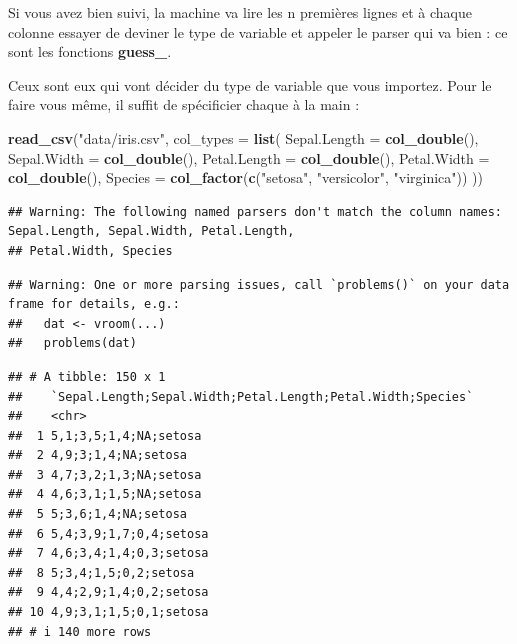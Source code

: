 \documentclass[
]{book}
\newenvironment{Shaded}{\begin{snugshade}}{\end{snugshade}}
\newcommand{\AttributeTok}[1]{\textcolor[rgb]{0.13,0.29,0.53}{#1}}
\newcommand{\FunctionTok}[1]{\textcolor[rgb]{0.13,0.29,0.53}{\textbf{#1}}}
\newcommand{\NormalTok}[1]{#1}
\newcommand{\StringTok}[1]{\textcolor[rgb]{0.31,0.60,0.02}{#1}}
\begin{document}
Si vous avez bien suivi, la machine va lire les n premières lignes et à chaque
colonne essayer de deviner le type de variable et appeler le parser qui va
bien : ce sont les fonctions \textbf{guess\_}.

Ceux sont eux qui vont décider du type de variable que vous importez. Pour le
faire vous même, il suffit de spécificier chaque à la main :

\begin{Shaded}
\begin{Highlighting}[]
\FunctionTok{read\_csv}\NormalTok{(}\StringTok{"data/iris.csv"}\NormalTok{, }\AttributeTok{col\_types =} \FunctionTok{list}\NormalTok{(}
  \AttributeTok{Sepal.Length =} \FunctionTok{col\_double}\NormalTok{(),}
  \AttributeTok{Sepal.Width =} \FunctionTok{col\_double}\NormalTok{(),}
  \AttributeTok{Petal.Length =} \FunctionTok{col\_double}\NormalTok{(),}
  \AttributeTok{Petal.Width =} \FunctionTok{col\_double}\NormalTok{(),}
  \AttributeTok{Species =} \FunctionTok{col\_factor}\NormalTok{(}\FunctionTok{c}\NormalTok{(}\StringTok{"setosa"}\NormalTok{, }\StringTok{"versicolor"}\NormalTok{, }\StringTok{"virginica"}\NormalTok{))}
\NormalTok{))}
\end{Highlighting}
\end{Shaded}

\begin{verbatim}
## Warning: The following named parsers don't match the column names: Sepal.Length, Sepal.Width, Petal.Length,
## Petal.Width, Species
\end{verbatim}

\begin{verbatim}
## Warning: One or more parsing issues, call `problems()` on your data frame for details, e.g.:
##   dat <- vroom(...)
##   problems(dat)
\end{verbatim}

\begin{verbatim}
## # A tibble: 150 x 1
##    `Sepal.Length;Sepal.Width;Petal.Length;Petal.Width;Species`
##    <chr>                                                      
##  1 5,1;3,5;1,4;NA;setosa                                      
##  2 4,9;3;1,4;NA;setosa                                        
##  3 4,7;3,2;1,3;NA;setosa                                      
##  4 4,6;3,1;1,5;NA;setosa                                      
##  5 5;3,6;1,4;NA;setosa                                        
##  6 5,4;3,9;1,7;0,4;setosa                                     
##  7 4,6;3,4;1,4;0,3;setosa                                     
##  8 5;3,4;1,5;0,2;setosa                                       
##  9 4,4;2,9;1,4;0,2;setosa                                     
## 10 4,9;3,1;1,5;0,1;setosa                                     
## # i 140 more rows
\end{verbatim}
\end{document}
